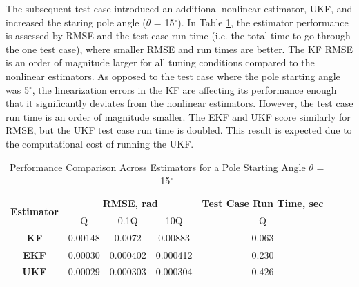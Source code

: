 \documentclass{article}
\begin{document}
 The subsequent test case introduced an additional nonlinear estimator, UKF, and increased the staring pole angle ($\theta$ = 15$^{\circ}$).  In Table \ref{table:rmse}, the estimator performance is assessed by RMSE and the test case run time (i.e. the total time to go through the one test case), where smaller RMSE and run times are better.  The KF RMSE is an order of magnitude larger for all tuning conditions compared to the nonlinear estimators.  As opposed to the test case where the pole starting angle was 5$^{\circ}$, the linearization errors in the KF are affecting its performance enough that it significantly deviates from the nonlinear estimators.  However, the test case run time is an order of magnitude smaller.  The EKF and UKF score similarly for RMSE, but the UKF test case run time is doubled.  This result is expected due to the computational cost of running the UKF.
 \begin{table}[h!]
 \centering
 \renewcommand{\arraystretch}{1.5}
\begin{tabular}{|c|c|c|c|c|}
	\hline
	\multirow{2}{*}{\textbf{Estimator}} & \multicolumn{3}{c|}{\textbf{RMSE, rad}} & \textbf{Test Case Run Time, sec} \\ \cline{2-5}
	& Q & 0.1Q & 10Q & Q \\ \hline
	\textbf{KF} & 0.00148 & 0.0072 & 0.00883 & 0.063 \\ \hline
	\textbf{EKF} & 0.00030 & 0.000402 & 0.000412 & 0.230 \\ \hline
	\textbf{UKF} & 0.00029 & 0.000303 & 0.000304 & 0.426 \\ \hline
\end{tabular}
 \caption{Performance Comparison Across Estimators for a Pole Starting Angle $\theta$ = 15$^{\circ}$}
 \label{table:rmse}
 \end{table}
 
\end{document}
